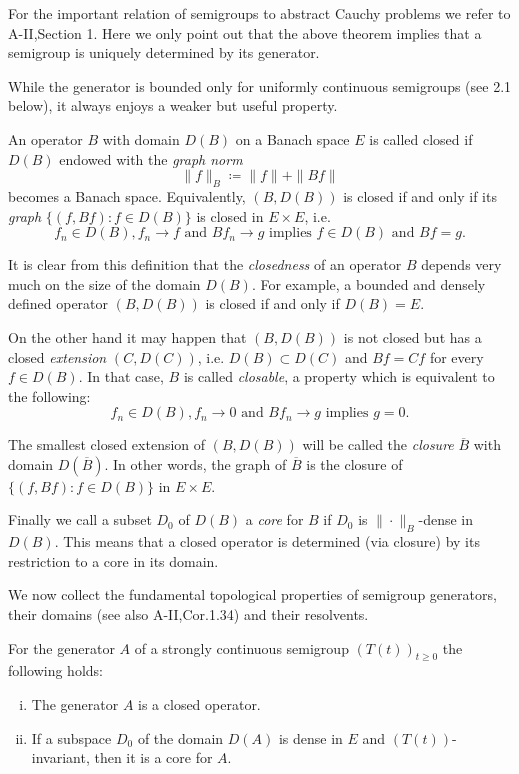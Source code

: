 \newpage

For the important relation of semigroups to abstract Cauchy problems we refer to A-II,Section 1.
Here we only point out that the above theorem implies that a semigroup is uniquely determined by its generator.

While the generator is bounded only for uniformly continuous semigroups (see 2.1 below), it always enjoys a weaker but useful property.
\begin{definition}\label{def:a1-1.8}
An operator $B$ with domain $D(B)$ on a Banach space $E$ is called closed if $D(B)$ endowed with the \emph{graph norm}
\[
    \|f\|_{B} \coloneqq \|f\| + \|Bf\|
\]
becomes a Banach space.
Equivalently, $(B,D(B))$ is closed if and only if its \emph{graph} $\{(f,Bf) \colon f \in D(B)\}$ is closed in $E \times E$, i.e.
\[
    f_{n} \in D(B), f_{n} \to f \text{ and } Bf_{n} \to g \text{ implies } f \in D(B) \text{ and } Bf = g.
\]
\end{definition}

It is clear from this definition that the \emph{closedness} of an operator $B$ depends very much on the size of the domain $D(B)$.
For example, a bounded and densely defined operator $(B,D(B))$ is closed if and only if $D(B) = E$.

On the other hand it may happen that $(B,D(B))$ is not closed but has a closed \emph{extension} $(C,D(C))$, i.e. $D(B) \subset D(C)$ and $Bf = Cf$ for every $f \in D(B)$.
In that case, $B$ is called \emph{closable}, a property which is equivalent to the following:
\[
    f_{n} \in D(B), f_{n} \to 0 \text{ and } Bf_{n} \to g \text{ implies } g = 0.
\]

The smallest closed extension of $(B,D(B))$ will be called the \emph{closure} $\overline{B}$ with domain $D(\overline{B})$.
In other words, the graph of $\overline{B}$ is the closure of $\{(f,Bf) \colon f \in D(B)\}$ in $E \times E$.

Finally we call a subset $D_{0}$ of $D(B)$ a \emph{core} for $B$ if $D_{0}$ is $\|\cdot\|_{B}$-dense in $D(B)$.
This means that a closed operator is determined (via closure) by its restriction to a core in its domain.

We now collect the fundamental topological properties of semigroup generators, their domains (see also A-II,Cor.1.34) and their resolvents.
\begin{proposition}\label{prop:a1-1.9}
For the generator $A$ of a strongly continuous semigroup $(T(t))_{t \geq 0}$ the following holds:
\begin{enumerate}[(i)]
\item 
The generator $A$ is a closed operator.

\item
If a subspace $D_{0}$ of the domain $D(A)$ is dense in $E$ and $(T(t))$-invariant, then it is a core for $A$.
\end{enumerate}
\end{proposition}

